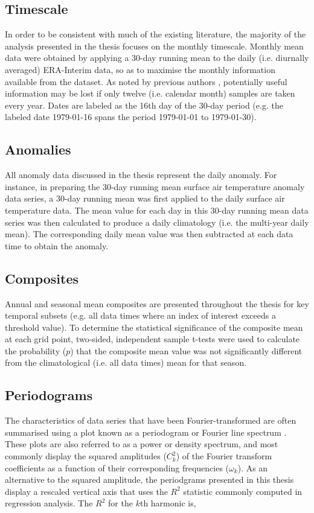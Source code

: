 
\subsection{Timescale}
In order to be consistent with much of the existing literature, the majority of the analysis presented in the thesis focuses on the monthly timescale. Monthly mean data were obtained by applying a 30-day running mean to the daily (i.e. diurnally averaged) ERA-Interim data, so as to maximise the monthly information available from the dataset. As noted by previous authors \citep[e.g.][]{Kidson1988}, potentially useful information may be lost if only twelve (i.e. calendar month) samples are taken every year. Dates are labeled as the 16th day of the 30-day period (e.g. the labeled date 1979-01-16 spans the period 1979-01-01 to 1979-01-30). 

\subsection{Anomalies}
All anomaly data discussed in the thesis represent the daily anomaly. For instance, in preparing the 30-day running mean surface air temperature anomaly data series, a 30-day running mean was first applied to the daily surface air temperature data. The mean value for each day in this 30-day running mean data series was then calculated to produce a daily climatology (i.e. the multi-year daily mean). The corresponding daily mean value was then subtracted at each data time to obtain the anomaly.  

\subsection{Composites}
Annual and seasonal mean composites are presented throughout the thesis for key temporal subsets (e.g. all data times where an index of interest exceeds a threshold value). To determine the statistical significance of the composite mean at each grid point, two-sided, independent sample t-tests were used to calculate the probability ($p$) that the composite mean value was not significantly different from the climatological (i.e. all data times) mean for that season.

\subsection{Periodograms}
The characteristics of data series that have been Fourier-transformed are often summarised using a plot known as a periodogram or Fourier line spectrum \citep{Wilks2011}. These plots are also referred to as a power or density spectrum, and most commonly display the squared amplitudes ($C_k^2$) of the Fourier transform coefficients as a function of their corresponding frequencies ($\omega_k$). As an alternative to the squared amplitude, the periodgrams presented in this thesis display a rescaled vertical axis that uses the $R^2$ statistic commonly computed in regression analysis. The $R^2$ for the $k$th harmonic is,

